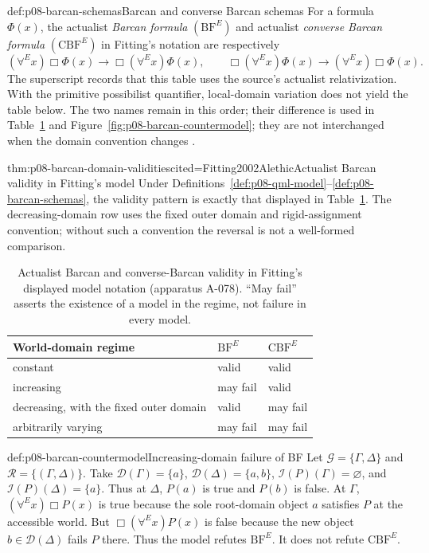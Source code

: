 \begin{hbdefinition}{def:p08-barcan-schemas}{Barcan and converse Barcan schemas}
For a formula \(\Phi(x)\), the actualist \emph{Barcan formula}
\((\mathrm{BF}^{E})\) and actualist \emph{converse Barcan formula}
\((\mathrm{CBF}^{E})\) in Fitting's notation are respectively
\[
 (\forall^{E}x)\Box\Phi(x)\to\Box(\forall^{E}x)\Phi(x),
 \qquad
 \Box(\forall^{E}x)\Phi(x)\to(\forall^{E}x)\Box\Phi(x).
\]
The superscript records that this table uses the source's actualist
relativization.  With the primitive possibilist quantifier, local-domain
variation does not yield the table below.  The two names remain in this order;
their difference
is used in Table~\ref{tab:p08-barcan-domains} and
Figure~\ref{fig:p08-barcan-countermodel}; they are not interchanged when the
domain convention changes \cite{Barcan1946}.
\end{hbdefinition}

\begin{hbtheorem}{thm:p08-barcan-domain-validities}{cited=Fitting2002Alethic}{Actualist Barcan validity in Fitting's model}
Under Definitions~\ref{def:p08-qml-model}--\ref{def:p08-barcan-schemas}, the
validity pattern is exactly that displayed in
Table~\ref{tab:p08-barcan-domains}.  The decreasing-domain row uses the fixed
outer domain and rigid-assignment convention; without such a convention the
reversal is not a well-formed comparison.
\end{hbtheorem}

\begin{table}[!htbp]
\centering
\begin{tabular}{@{}lll@{}}
\toprule
World-domain regime & \(\mathrm{BF}^{E}\) & \(\mathrm{CBF}^{E}\) \\
\midrule
constant & valid & valid \\
increasing & may fail & valid \\
decreasing, with the fixed outer domain & valid & may fail \\
arbitrarily varying & may fail & may fail \\
\bottomrule
\end{tabular}
\caption{Actualist Barcan and converse-Barcan validity in Fitting's displayed
model notation (apparatus A-078).  ``May fail'' asserts the existence of a
model in the regime, not failure in every model.}
\label{tab:p08-barcan-domains}
\end{table}

\begin{hbexample}{def:p08-barcan-countermodel}{Increasing-domain failure of BF}
Let \(\mathcal G=\{\Gamma,\Delta\}\) and
\(\mathcal R=\{(\Gamma,\Delta)\}\).  Take
\(\mathcal D(\Gamma)=\{a\}\),
\(\mathcal D(\Delta)=\{a,b\}\),
\(\mathcal I(P)(\Gamma)=\varnothing\), and
\(\mathcal I(P)(\Delta)=\{a\}\).  Thus at \(\Delta\), \(P(a)\) is true and
\(P(b)\) is false.  At \(\Gamma\),
\((\forall^{E}x)\Box P(x)\) is true because the sole root-domain
object \(a\) satisfies \(P\) at the accessible world.  But
\(\Box(\forall^{E}x)P(x)\) is false because the new object
\(b\in\mathcal D(\Delta)\) fails \(P\) there.  Thus the model refutes
\(\mathrm{BF}^{E}\).  It does not refute \(\mathrm{CBF}^{E}\).
\end{hbexample}

